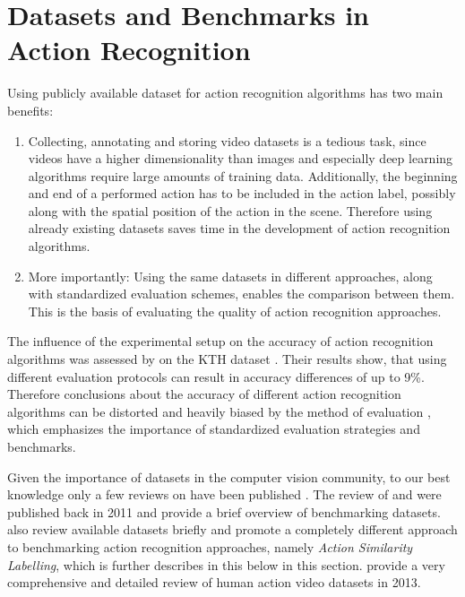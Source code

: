 \section{Datasets and Benchmarks in Action Recognition}
\label{chap:datasets}

Using publicly available dataset for action recognition algorithms has two main benefits:
\begin{enumerate}
    \item Collecting, annotating and storing video datasets is a tedious task, since videos have a higher dimensionality than images and especially deep learning algorithms require large amounts of training data. Additionally, the beginning and end of a performed action has to be included in the action label, possibly along with the spatial position of the action in the scene. Therefore using already existing datasets saves time in the development of action recognition algorithms.
    \item More importantly: Using the same datasets in different approaches, along with standardized evaluation schemes, enables the comparison between them. This is the basis of evaluating the quality of action recognition approaches. 
\end{enumerate}

The influence of the experimental setup on the accuracy of action recognition algorithms was assessed by \cite{gao_comparing_2010} on the KTH dataset \cite{schuldt_recognizing_2004}.
Their results show, that using different evaluation protocols can result in accuracy differences of up to 9\%.
Therefore conclusions about the accuracy of different action recognition algorithms can be distorted and heavily biased by the method of evaluation \cite{baccouche_sequential_2011}, which emphasizes the importance of standardized evaluation strategies and benchmarks.

Given the importance of datasets in the computer vision community, to our best knowledge only a few reviews on have been published \cite{ahad_action_2011}\cite{liu_benchmarking_2011}\cite{hassner_critical_2013}\cite{chaquet_survey_2013}.
The review of \textcite{ahad_action_2011} and \textcite{liu_benchmarking_2011} were published back in 2011 and provide a brief overview of benchmarking datasets.
\textcite{hassner_critical_2013} also review available datasets briefly and promote a completely different approach to benchmarking action recognition approaches, namely \textit{Action Similarity Labelling}, which is further describes in this below in this section.
\textcite{chaquet_survey_2013} provide a very comprehensive and detailed review of human action video datasets in 2013.

